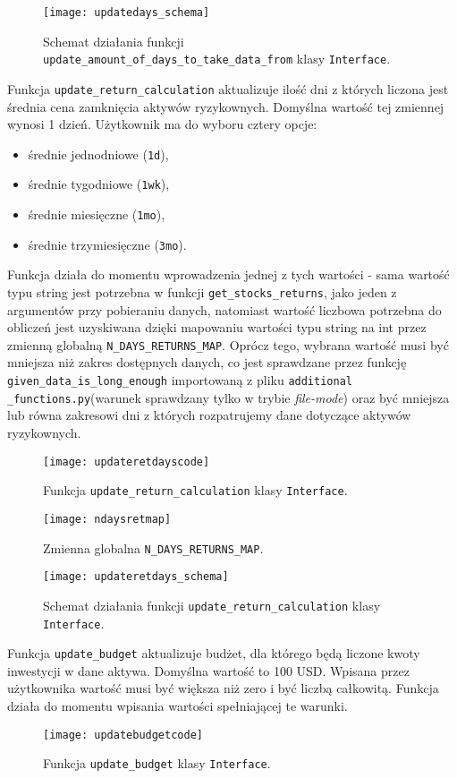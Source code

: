 \documentclass[magister]{dyplom}
\def\code#1{\texttt{#1}}
\begin{document}
\begin{figure}[ht]
	\centering
	\texttt{[image: updatedays\_schema]}
	\caption{Schemat działania funkcji \code{update\_amount\_of\_days\_to\_take\_data\_from} klasy \code{Interface}.}
\end{figure}
\newpage
Funkcja \code{update\_return\_calculation} aktualizuje ilość dni z których liczona jest średnia cena zamknięcia aktywów ryzykownych. Domyślna wartość tej zmiennej wynosi 1 dzień. Użytkownik ma do wyboru cztery opcje:
\begin{itemize}
	\item średnie jednodniowe (\code{1d}),
	\item średnie tygodniowe (\code{1wk}),
	\item średnie miesięczne (\code{1mo}),
	\item średnie trzymiesięczne (\code{3mo}).
\end{itemize}
Funkcja działa do momentu wprowadzenia jednej z tych wartości - sama wartość typu string jest potrzebna w funkcji \code{get\_stocks\_returns}, jako jeden z argumentów przy pobieraniu danych, natomiast wartość liczbowa potrzebna do obliczeń jest uzyskiwana dzięki mapowaniu wartości typu string na int przez zmienną globalną \code{N\_DAYS\_RETURNS\_MAP}.
Oprócz tego, wybrana wartość musi być mniejsza niż zakres dostępnych danych, co jest sprawdzane przez funkcję \code{given\_data\_is\_long\_enough} importowaną z pliku \code{additional} \code{\_functions.py}(warunek sprawdzany tylko w trybie \textit{file-mode}) oraz być mniejsza lub równa zakresowi dni z których rozpatrujemy dane dotyczące aktywów ryzykownych.
\begin{figure}[ht]
	\centering
	\texttt{[image: updateretdayscode]}
	\caption{Funkcja \code{update\_return\_calculation} klasy \code{Interface}.}
\end{figure}

\begin{figure}[ht!]
	\centering
	\texttt{[image: ndaysretmap]}
	\caption{Zmienna globalna \code{N\_DAYS\_RETURNS\_MAP}.}
\end{figure}

\begin{figure}[ht!]
	\centering
	\texttt{[image: updateretdays\_schema]}
	\caption{Schemat działania funkcji \code{update\_return\_calculation} klasy \code{Interface}.}
\end{figure}
\newpage
Funkcja \code{update\_budget} aktualizuje budżet, dla którego będą liczone kwoty inwestycji w dane aktywa. Domyślna wartość to 100 USD. Wpisana przez użytkownika wartość musi być większa niż zero i być liczbą całkowitą. Funkcja działa do momentu wpisania wartości spełniającej te warunki.
\begin{figure}[ht!]
	\centering
	\texttt{[image: updatebudgetcode]}
	\caption{Funkcja \code{update\_budget} klasy \code{Interface}.}
\end{figure}
\end{document}
